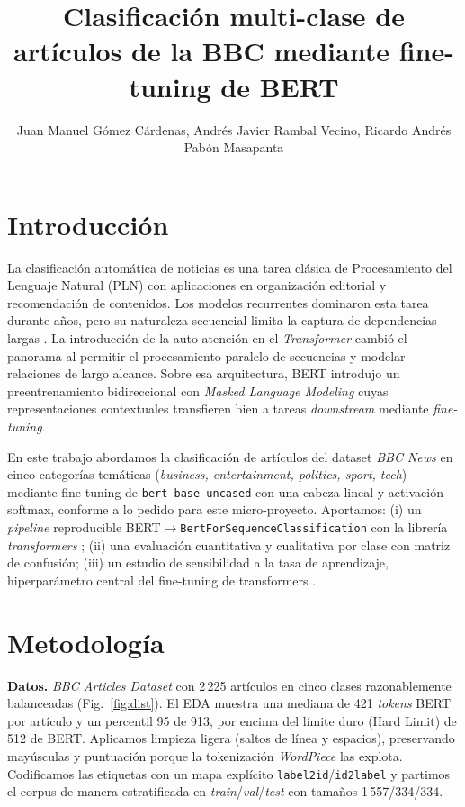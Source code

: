 \documentclass[letterpaper, 10 pt, conference]{ieeeconf}
\title{\LARGE \bf
Clasificaci\'on multi-clase de art\'iculos de la BBC mediante fine-tuning de BERT
}
\author{Juan Manuel Gómez Cárdenas, Andrés Javier Rambal Vecino, Ricardo Andrés Pabón Masapanta}
\begin{document}
\maketitle
\thispagestyle{empty}
\pagestyle{empty}

\section{Introducci\'on}

La clasificaci\'on autom\'atica de noticias es una tarea cl\'asica de Procesamiento del Lenguaje Natural (PLN) con aplicaciones en organizaci\'on editorial y recomendaci\'on de contenidos. Los modelos recurrentes dominaron esta tarea durante a\~nos, pero su naturaleza secuencial limita la captura de dependencias largas \cite{rnn_vs_tx}. La introducci\'on de la auto-atenci\'on en el \emph{Transformer} \cite{attention} cambi\'o el panorama al permitir el procesamiento paralelo de secuencias y modelar relaciones de largo alcance. Sobre esa arquitectura, BERT \cite{bert} introdujo un preentrenamiento bidireccional con \emph{Masked Language Modeling} cuyas representaciones contextuales transfieren bien a tareas \emph{downstream} mediante \emph{fine-tuning}.

En este trabajo abordamos la clasificaci\'on de art\'iculos del dataset \emph{BBC News} \cite{bbcdata} en cinco categor\'ias tem\'aticas (\emph{business, entertainment, politics, sport, tech}) mediante fine-tuning de \texttt{bert-base-uncased} con una cabeza lineal y activaci\'on softmax, conforme a lo pedido para este micro-proyecto. Aportamos: (i) un \emph{pipeline} reproducible BERT$\rightarrow$\texttt{BertForSequenceClassification} con la librer\'ia \emph{transformers} \cite{hf}; (ii) una evaluaci\'on cuantitativa y cualitativa por clase con matriz de confusi\'on; (iii) un estudio de sensibilidad a la tasa de aprendizaje, hiperpar\'ametro central del fine-tuning de transformers \cite{bert}.

\section{Metodolog\'ia}

\textbf{Datos.} \emph{BBC Articles Dataset} \cite{bbcdata} con 2\,225 art\'iculos en cinco clases razonablemente balanceadas (Fig.~\ref{fig:dist}). El EDA muestra una mediana de 421 \emph{tokens} BERT por art\'iculo y un percentil 95 de 913, por encima del l\'imite duro (Hard Limit) de 512 de BERT. Aplicamos limpieza ligera (saltos de l\'inea y espacios), preservando may\'usculas y puntuaci\'on porque la tokenizaci\'on \emph{WordPiece} las explota. Codificamos las etiquetas con un mapa expl\'icito \texttt{label2id}/\texttt{id2label} y partimos el corpus de manera estratificada en \emph{train}/\emph{val}/\emph{test} con tama\~nos 1\,557/334/334.
\end{document}
